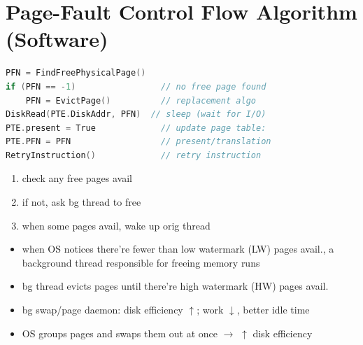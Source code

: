 \section*{Page-Fault Control Flow Algorithm (Software)}
\begin{minipage}{.72\linewidth}
\begin{lstlisting}[language=c]
PFN = FindFreePhysicalPage()
if (PFN == -1)                 // no free page found
    PFN = EvictPage()          // replacement algo
DiskRead(PTE.DiskAddr, PFN)  // sleep (wait for I/O)
PTE.present = True             // update page table:
PTE.PFN = PFN                  // present/translation
RetryInstruction()             // retry instruction
\end{lstlisting}
\end{minipage}
\begin{minipage}{.28\linewidth}
  \flushleft
  \begin{enumerate}
  \item check any free pages avail
  \item if not, ask bg thread to free
  \item when some pages avail, wake up orig thread
  \end{enumerate}
\end{minipage}

\begin{itemize}
\item when OS notices there're fewer than low watermark (LW) pages avail., a background thread responsible for freeing memory runs
\item bg thread evicts pages until there're high watermark (HW) pages avail.
\item bg swap/page daemon: disk efficiency $\uparrow$; work $\downarrow$, better idle time
\item OS groups pages and swaps them out at once $\to$ $\uparrow$ disk efficiency
\end{itemize}
